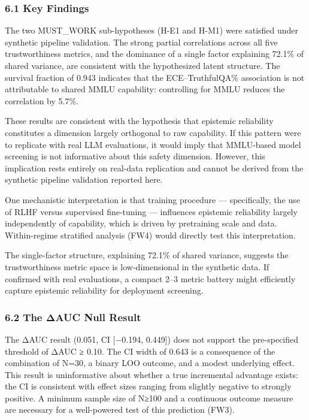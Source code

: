 
\subsubsection{6.1 Key Findings}

The two MUST_WORK sub-hypotheses (H-E1 and H-M1) were satisfied under synthetic pipeline validation. The strong partial correlations across all five trustworthiness metrics, and the dominance of a single factor explaining 72.1\% of shared variance, are consistent with the hypothesized latent structure. The survival fraction of 0.943 indicates that the ECE–TruthfulQA\% association is not attributable to shared MMLU capability: controlling for MMLU reduces the correlation by 5.7\%.

These results are consistent with the hypothesis that epistemic reliability constitutes a dimension largely orthogonal to raw capability. If this pattern were to replicate with real LLM evaluations, it would imply that MMLU-based model screening is not informative about this safety dimension. However, this implication rests entirely on real-data replication and cannot be derived from the synthetic pipeline validation reported here.

One mechanistic interpretation is that training procedure — specifically, the use of RLHF versus supervised fine-tuning — influences epistemic reliability largely independently of capability, which is driven by pretraining scale and data. Within-regime stratified analysis (FW4) would directly test this interpretation.

The single-factor structure, explaining 72.1\% of shared variance, suggests the trustworthiness metric space is low-dimensional in the synthetic data. If confirmed with real evaluations, a compact 2–3 metric battery might efficiently capture epistemic reliability for deployment screening.

\subsubsection{6.2 The ΔAUC Null Result}

The ΔAUC result (0.051, CI [−0.194, 0.449]) does not support the pre-specified threshold of ΔAUC ≥ 0.10. The CI width of 0.643 is a consequence of the combination of N=30, a binary LOO outcome, and a modest underlying effect. This result is uninformative about whether a true incremental advantage exists: the CI is consistent with effect sizes ranging from slightly negative to strongly positive. A minimum sample size of N≥100 and a continuous outcome measure are necessary for a well-powered test of this prediction (FW3).

